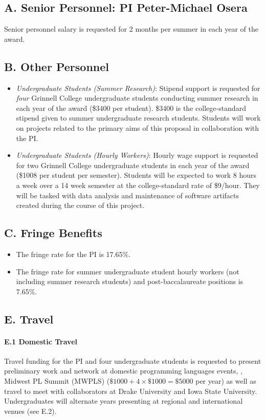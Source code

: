 \documentclass[11pt]{article}
\begin{document}
\smalltitle{}

\subsection*{A. Senior Personnel: PI Peter-Michael Osera}
Senior personnel salary is requested for 2 months per summer in each year of the award.

\subsection*{B. Other Personnel}
\begin{itemize}[itemsep=0pt]
  \item \emph{Undergraduate Students (Summer Research)}: Stipend support is requested for \emph{four} Grinnell College undergraduate students conducting summer research in each year of the award (\$3400 per student).
    \$3400 is the college-standard stipend given to summer undergraduate research students.
    Students will work on projects related to the primary aims of this proposal in collaboration with the PI.
  \item \emph{Undergraduate Students (Hourly Workers)}: Hourly wage support is requested for two Grinnell College undergraduate students in each year of the award (\$1008 per student per semester).
    Students will be expected to work 8 hours a week over a 14 week semester at the college-standard rate of \$9/hour.
    They will be tasked with data analysis and maintenance of software artifacts created during the course of this project.
\end{itemize}

\subsection*{C. Fringe Benefits}
\begin{itemize}[itemsep=0ex]
  \item The fringe rate for the PI is 17.65\%.
  \item The fringe rate for summer undergraduate student hourly workers (not including summer research students) and post-baccalaureate positions is 7.65\%.
\end{itemize}

\subsection*{E. Travel}

\paragraph{E.1 Domestic Travel}
Travel funding for the PI and four undergraduate students is requested to present preliminary work and network at domestic programming languages events, \eg, Midwest PL Summit (MWPLS) (\( \$1000 + 4 × \$1000 = \$5000 \) per year) as well as travel to meet with collaborators at Drake University and Iowa State University.
Undergraduates will alternate years presenting at regional and international venues (see E.2).
\end{document}
